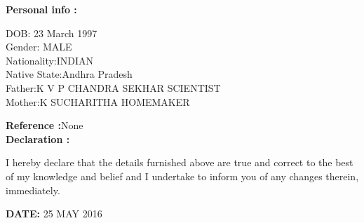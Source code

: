 \documentclass{article}
\begin{document}
\textbf{Personal info :}
		\begin{center}
			DOB: 23 March 1997\\
			Gender: MALE\\
			Nationality:INDIAN\\
			Native State:Andhra Pradesh\\
		    Father:K V P  CHANDRA SEKHAR SCIENTIST\\
	     	Mother:K SUCHARITHA   HOMEMAKER\\
		
		\end{center}

\textbf{Reference :}None \\

\textbf{Declaration :}
	\begin{flushleft}
		I hereby declare that the details furnished above are true and correct to the best of my knowledge
		and belief and I undertake to inform you of any changes therein, immediately.
	\end{flushleft}	 

\begin{flushright}
	\textbf{DATE:} 25 MAY 2016
\end{flushright}
\end{document}
